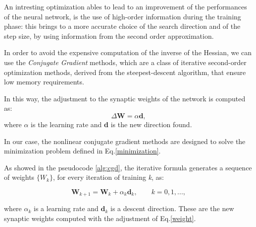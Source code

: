 		An intresting optimization ables to lead to an improvement of the performances of the neural network, is the use of high-order information during the training phase: this brings to a more accurate choice of the search direction and of the step size, by using information from the second order approximation.

		In order to avoid the expensive computation of the inverse of the Hessian, we can use the \textit{Conjugate Gradient} methods, which are a class of iterative second-order optimization methods, derived from the steepest-descent algorithm, that ensure low memory requirements.

		In this way, the adjustment to the synaptic weights of the network is computed as:
		 \begin{equation}
		 	\label{weight}
		    \Delta\textbf{W} = \alpha\textbf{d},
		 \end{equation}
		where $\alpha$ is the learning rate and \textbf{d} is the new direction found.

		In our case, the nonlinear conjugate gradient methods are designed to solve the minimization problem defined in Eq.\ref{minimization}.

		As showed in the pseudocode \ref{alg:cgd}, the iterative formula generates a sequence of weights $\{W_k\}$, for every iteration of training \textit{k}, as:

		\begin{equation}
			\textbf{W}_{k+1} = \textbf{W}_{k} + \alpha_k\textbf{d}_k, \text{  }\text{  }\text{  } \textit{k} = 0,1,...,
		\end{equation}

		where $\alpha_k$ is a learning rate and $\textbf{d}_k$ is a descent direction. These are the new synaptic weights computed with the adjustment of Eq.\ref{weight}.


